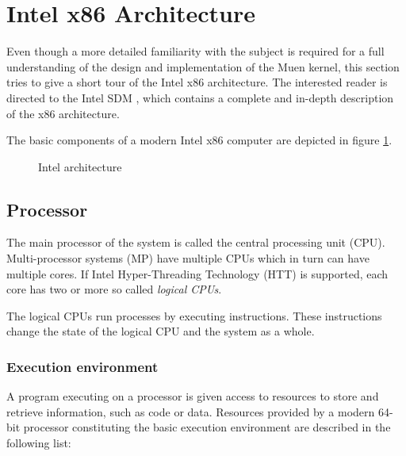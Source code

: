 \section{Intel x86 Architecture}
Even though a more detailed familiarity with the subject is required for a full
understanding of the design and implementation of the Muen kernel, this section
tries to give a short tour of the Intel x86 architecture. The interested reader
is directed to the Intel SDM \cite{IntelSDM}, which contains a complete and
in-depth description of the x86 architecture.

The basic components of a modern Intel x86 computer are depicted in figure
\ref{fig:intel-architecture}.

\begin{figure}[h]
	\centering
	
	\caption{Intel architecture}
	\label{fig:intel-architecture}
\end{figure}

\subsection{Processor}
The main processor of the system is called the central processing unit
(CPU). Multi-processor systems (MP) have multiple CPUs
which in turn can have multiple cores. If Intel Hyper-Threading Technology (HTT)
is supported, each core has two or more so called \emph{logical CPUs}.

The logical CPUs run processes by executing instructions. These instructions
change the state of the logical CPU and the system as a whole.

\subsubsection{Execution environment}\label{subsubsec:exec-env}
A program executing on a processor is given access to resources to store and
retrieve information, such as code or data. Resources provided by a modern
64-bit processor constituting the basic execution environment are described in
the following list:

